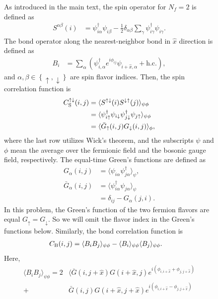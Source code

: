 \documentclass[aps,prl,twocolumn,superscriptaddress,showpacs,longbibliography]{revtex4-2}
\newcommand{\hatx}{\hat{x}}
\newcommand{\tx}[1]{\textmd{#1}}
\newcommand{\leftc}{\left\{ }
\newcommand{\rightc}{\right\} }
\newcommand{\nn}{\nonumber}
\begin{document}
\begin{figure}
As introduced in the main text, the spin operator for $N_f = 2$ is defined as
\begin{align}
    S^{\alpha\beta}(i)&=\psi_{i\alpha}^{\dagger}\psi_{i\beta}-\frac{1}{2}\delta_{\alpha\beta}\sum_{\gamma}\psi_{i\gamma}^{\dagger}\psi_{i\gamma}.
\end{align}
The bond operator  along the nearest-neighbor bond in $\hat{x}$ direction is defined as 
\begin{align}
    B_{i}&=\sum_{\alpha}(\psi^{\dagger}_{i,\alpha}e^{i \phi_{ij}} \psi_{i+\hat{x},\alpha}+\text{h.c.}),
\end{align}
and $\alpha, \beta \in \leftc\uparrow, \downarrow\rightc$ are spin flavor indices. Then, the spin correlation function is
\begin{align}
    C_\tx{S}^{\uparrow\downarrow}(i, j) &=\langle
    S^{\uparrow\downarrow}(i)S^{\downarrow\uparrow}(j)\rangle_{\psi \phi} \\
    &= \langle \psi^\dagger_{i\uparrow}\psi_{i\downarrow}\psi^\dagger_{j\downarrow}\psi_{j\uparrow}\rangle_{\psi \phi} \\
    & = \langle\bar{G}_{\uparrow}(i, j)G_\downarrow(i, j)\rangle_{\phi},
\end{align}
where the last row utilizes Wick's theorem, and the subscripts $\psi$ and $\phi$ mean the average over the fermionic field and the bosonic gauge field, respectively.
The equal-time Green's functions are defined as 
\begin{align}
    G_\alpha (i, j) &= \langle \psi_{i\alpha}\psi^\dagger_{j\alpha} \rangle_\psi, \\
    \bar{G}_\alpha (i, j) &= \langle \psi^\dagger_{i\alpha}\psi_{j\alpha} \rangle_\psi \\
    &= \delta_{ij} - G_\alpha (j, i).
\end{align}
In this problem, the Green's function of the two fermion flavors are equal $G_\uparrow = G_\downarrow$. So we will omit the flavor index in the Green's functions below.  
Similarly, the bond correlation function is 
\begin{align}
    C_\tx{B}(i, j) &= \langle B_i B_j \rangle_{\psi \phi} - \langle B_i\rangle_{\psi \phi} \langle B_j\rangle_{\psi \phi}.
\end{align}
Here, 
\begin{align}
    \langle B_i B_j \rangle_{\psi \phi} = 2
    &\langle 
        \bar{G}(i, j+\hatx) G(i+\hatx, j)e^{i(\phi_{i, i+\hatx} + \phi_{j,j+\hatx})}  \nn \\
        + &
        \bar{G}(i, j)G(i+\hatx, j+\hatx) e^{i(\phi_{i, i+\hatx} - \phi_{j, j+\hatx})} \nn \\

\end{align}
\end{figure}
\end{document}
